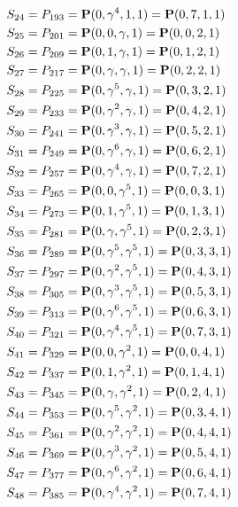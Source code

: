 \documentclass{article}
\newcommand{\bP}{{\bf P}}
\begin{document}
{\begin{align*}
S_{24} &= P_{193}=\bP(0, \gamma^{4}, 1, 1) = \bP(0, 7, 1, 1)\\
S_{25} &= P_{201}=\bP(0, 0, \gamma , 1) = \bP(0, 0, 2, 1)\\
S_{26} &= P_{209}=\bP(0, 1, \gamma , 1) = \bP(0, 1, 2, 1)\\
S_{27} &= P_{217}=\bP(0, \gamma , \gamma , 1) = \bP(0, 2, 2, 1)\\
S_{28} &= P_{225}=\bP(0, \gamma^{5}, \gamma , 1) = \bP(0, 3, 2, 1)\\
S_{29} &= P_{233}=\bP(0, \gamma^{2}, \gamma , 1) = \bP(0, 4, 2, 1)\\
S_{30} &= P_{241}=\bP(0, \gamma^{3}, \gamma , 1) = \bP(0, 5, 2, 1)\\
S_{31} &= P_{249}=\bP(0, \gamma^{6}, \gamma , 1) = \bP(0, 6, 2, 1)\\
S_{32} &= P_{257}=\bP(0, \gamma^{4}, \gamma , 1) = \bP(0, 7, 2, 1)\\
S_{33} &= P_{265}=\bP(0, 0, \gamma^{5}, 1) = \bP(0, 0, 3, 1)\\
S_{34} &= P_{273}=\bP(0, 1, \gamma^{5}, 1) = \bP(0, 1, 3, 1)\\
S_{35} &= P_{281}=\bP(0, \gamma , \gamma^{5}, 1) = \bP(0, 2, 3, 1)\\
S_{36} &= P_{289}=\bP(0, \gamma^{5}, \gamma^{5}, 1) = \bP(0, 3, 3, 1)\\
S_{37} &= P_{297}=\bP(0, \gamma^{2}, \gamma^{5}, 1) = \bP(0, 4, 3, 1)\\
S_{38} &= P_{305}=\bP(0, \gamma^{3}, \gamma^{5}, 1) = \bP(0, 5, 3, 1)\\
S_{39} &= P_{313}=\bP(0, \gamma^{6}, \gamma^{5}, 1) = \bP(0, 6, 3, 1)\\
S_{40} &= P_{321}=\bP(0, \gamma^{4}, \gamma^{5}, 1) = \bP(0, 7, 3, 1)\\
S_{41} &= P_{329}=\bP(0, 0, \gamma^{2}, 1) = \bP(0, 0, 4, 1)\\
S_{42} &= P_{337}=\bP(0, 1, \gamma^{2}, 1) = \bP(0, 1, 4, 1)\\
S_{43} &= P_{345}=\bP(0, \gamma , \gamma^{2}, 1) = \bP(0, 2, 4, 1)\\
S_{44} &= P_{353}=\bP(0, \gamma^{5}, \gamma^{2}, 1) = \bP(0, 3, 4, 1)\\
S_{45} &= P_{361}=\bP(0, \gamma^{2}, \gamma^{2}, 1) = \bP(0, 4, 4, 1)\\
S_{46} &= P_{369}=\bP(0, \gamma^{3}, \gamma^{2}, 1) = \bP(0, 5, 4, 1)\\
S_{47} &= P_{377}=\bP(0, \gamma^{6}, \gamma^{2}, 1) = \bP(0, 6, 4, 1)\\
S_{48} &= P_{385}=\bP(0, \gamma^{4}, \gamma^{2}, 1) = \bP(0, 7, 4, 1)\\

\end{align*}}
\end{document}
